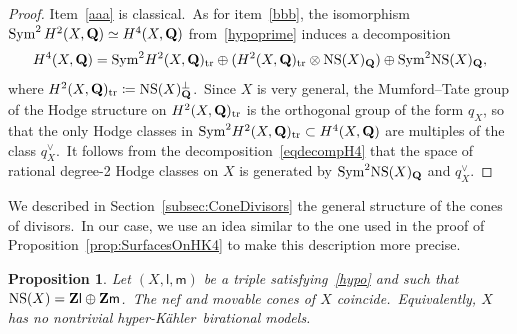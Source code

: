 \documentclass[12pt]{amsart}
\def\Z{{\bf Z}}
\def\Q{{\bf Q}}
\DeclareMathOperator{\NS}{NS}
\DeclareMathOperator{\Sym}{Sym}
\def\isom{\simeq}
\def\hk{hyper-K\"ahler}
\newtheorem{prop}[lemm]{Proposition}
\theoremstyle{remark}
\def\lll{\ensuremath{\mathsf l}}
\def\mm{\ensuremath{\mathsf m}}
\begin{document}
\begin{proof}
 Item~\ref{aaa} is classical.\ As for   item~\ref{bbb}, the isomorphism $\Sym^2H^2(X,\Q)\isom H^4(X,\Q)$ from~\eqref{hypoprime} induces a decomposition
\begin{eqnarray}\label{eqdecompH4}
H^4(X,\Q)={\Sym}^2H^2(X,\Q)_{\rm tr}\oplus (H^2(X,\Q)_{\rm tr}\otimes \NS(X)_{\Q})\oplus {\Sym}^2{\NS}(X)_{\Q},
\end{eqnarray}
where $H^2(X,\Q)_{\rm tr}\coloneqq \NS(X)_{\Q}^\perp$.\ Since  $X$ is very general, the Mumford--Tate group of the Hodge structure on $H^2(X,\Q)_{\rm tr}$ is the orthogonal group of the  form $q_X$, so that the only Hodge classes in ${\Sym}^2H^2(X,\Q)_{\rm tr}\subset H^4(X,\Q)$ are multiples of the class $q_X^\vee$.\ It follows from the decomposition~\eqref{eqdecompH4} that the space of rational degree-2 Hodge classes on $X$ is generated by ${\Sym}^2{\NS}(X)_{\Q}$ and $q_X^\vee$.
\end{proof}

We described in   Section~\ref{subsec:ConeDivisors} the general structure of the cones of divisors.\ In our case, we use an idea similar to the one used in the proof of   Proposition~\ref{prop:SurfacesOnHK4} to make this description more precise.

\begin{prop}\label{lem:NefCone4folds}
Let $(X,\lll,\mm)$ be a triple satisfying~\eqref{hypo} and such that~$\NS(X)=\Z\lll\oplus\Z\mm$.\
The nef and movable cones of $X$ coincide.\
Equivalently, $X$ has no nontrivial \hk\ birational models.
\end{prop}
\end{document}
